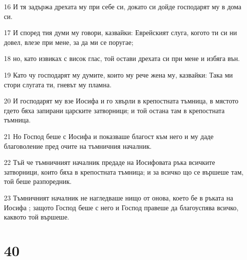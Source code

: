 \par 16 И тя задържа дрехата му при себе си, докато си дойде господарят му в дома си.
\par 17 И според тия думи му говори, казвайки: Еврейският слуга, когото ти си ни довел, влезе при мене, за да ми се поругае;
\par 18 но, като извиках с висок глас, той остави дрехата си при мене и избяга вън.
\par 19 Като чу господарят му думите, които му рече жена му, казвайки: Така ми стори слугата ти, гневът му пламна.
\par 20 И господарят му взе Иосифа и го хвърли в крепостната тъмница, в мястото гдето бяха запирани царските затворници; и той остана там в крепостната тъмница.
\par 21 Но Господ беше с Иосифа и показваше благост към него и му даде благоволение пред очите на тъмничния началник.
\par 22 Тъй че тъмничният началник предаде на Иосифовата ръка всичките затворници, които бяха в крепостната тъмница; и за всичко що се вършеше там, той беше разпоредник.
\par 23 Тъмничният началник не нагледваше нищо от онова, което бе в ръката на Иосифа ; защото Господ беше с него и Господ правеше да благоуспява всичко, каквото той вършеше.

\chapter{40}

